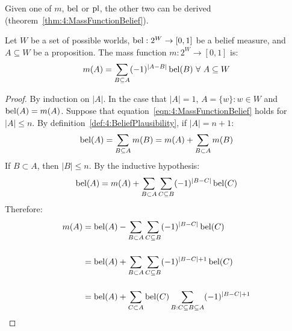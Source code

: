 Given one of $m$, $\operatorname*{bel}$ or $\operatorname*{pl}$, the other two can be derived
(theorem~\ref{thm:4:MassFunctionBelief}).

\begin{thm}
  \label{thm:4:MassFunctionBelief}
  Let $W$ be a set of possible worlds,
  $\operatorname*{bel} : 2^W \rightarrow [0, 1]$ be a belief measure, and
  $A \subseteq W$ be a proposition.
  The mass function $m : 2^W \rightarrow [0, 1]$ is:
  \begin{equation}
    \label{eqn:4:MassFunctionBelief}
    m(A) = \sum_{B \subseteq A} (-1)^{|A - B|} \operatorname*{bel}(B)
    \ \forall\
    A \subseteq W
  \end{equation}

  \begin{proof}
    By induction on $|A|$.
    In the case that $|A| = 1$, $A = \{w\} : w \in W$ and $\operatorname*{bel}(A) = m(A)$.
    Suppose that equation~\ref{eqn:4:MassFunctionBelief} holds for $|A| \leq n$.
    By definition~\ref{def:4:BeliefPlausibility}, if $|A| = n + 1$:
    \begin{equation*}
      \operatorname*{bel}(A) = \sum_{B \subseteq A} m(B) = m(A) + \sum_{B \subset A} m(B)
    \end{equation*}
    If $B \subset A$, then $|B| \leq n$.
    By the inductive hypothesis:
    \begin{equation*}
      \operatorname*{bel}(A) = m(A) + \sum_{B \subset A} \sum_{C \subseteq B} (-1)^{|B - C|} \operatorname*{bel}(C)
    \end{equation*}
    Therefore:
    \begin{align}
      \label{eqn:4:MassFunctionBelief1}
      m(A)
       & =
      \operatorname*{bel}(A) -
      \sum_{B \subset A} \sum_{C \subseteq B} (-1)^{|B - C|} \operatorname*{bel}(C)
      \nonumber \\[3ex]
       & =
      \operatorname*{bel}(A) +
      \sum_{B \subset A} \sum_{C \subseteq B} (-1)^{|B - C| + 1} \operatorname*{bel}(C)
      \nonumber \\[3ex]
       & =
      \operatorname*{bel}(A) +
      \sum_{C \subset A} \operatorname*{bel}(C) \sum_{B : C \subseteq B \subseteq A} (-1)^{|B - C| + 1}
    \end{align}


\end{proof}
\end{thm}
